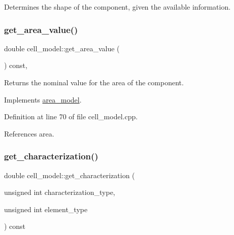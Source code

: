 Determines the shape of the component, given the available information. 

\mbox{\label{classcell__model_aa96db127d4432fd0a3f4f8db95e29fd8}} 
\subsubsection{\texorpdfstring{get\+\_\+area\+\_\+value()}{get\_area\_value()}}
{\footnotesize\ttfamily double cell\+\_\+model\+::get\+\_\+area\+\_\+value (\begin{DoxyParamCaption}{ }\end{DoxyParamCaption}) const\hspace{0.3cm}{\ttfamily [override]}, {\ttfamily [virtual]}}



Returns the nominal value for the area of the component. 



Implements \hyperlink{classarea__model_a390c12b38a4f2b1a137f6029d5494b97}{area\+\_\+model}.



Definition at line 70 of file cell\+\_\+model.\+cpp.



References area.

\mbox{\label{classcell__model_a538b317e7ed9feecb05c9714b935f4a1}} 
\subsubsection{\texorpdfstring{get\+\_\+characterization()}{get\_characterization()}}
{\footnotesize\ttfamily double cell\+\_\+model\+::get\+\_\+characterization (\begin{DoxyParamCaption}\item[{unsigned int}]{characterization\+\_\+type,  }\item[{unsigned int}]{element\+\_\+type }\end{DoxyParamCaption}) const}



